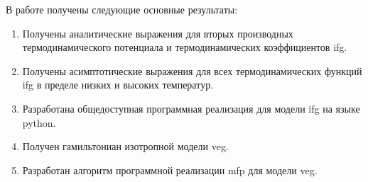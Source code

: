 
\conclusion

В работе получены следующие основные результаты:

\begin{enumerate}
    \item Получены аналитические выражения для вторых производных термодинамического потенциала и термодинамических коэффициентов \acrshort{ifg}.
    \item Получены асимптотические выражения для всех термодинамических функций \acrshort{ifg} в пределе низких и высоких температур.
    \item Разработана общедоступная программная реализация для модели \acrshort{ifg} на языке \Gls{python}.
    \item Получен гамильтониан изотропной модели \acrshort{veg}.
    \item Разработан алгоритм программной реализации \acrshort{mfp} для модели \acrshort{veg}.
\end{enumerate}